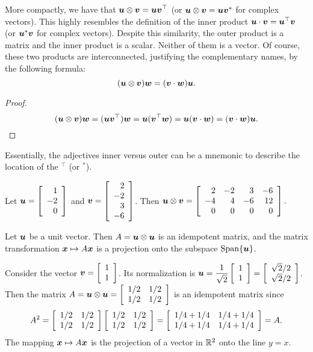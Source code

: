 More compactly, we have that $\bb u \otimes \bb v= \bb u\bb v^\top$ (or $\bb u \otimes \bb v = \bb u\bb v^*$ for complex vectors). This highly resembles the definition of the inner product  $\bb u \cdot \bb v = \bb u^\top \bb v$ (or $\bb u^*\bb v$ for complex vectors). Despite this similarity, the outer product is a matrix and the inner product is a scalar. Neither of them is a vector. Of course, these two products are interconnected, justifying the complementary names, by the following formula:
\[(\bb u\otimes \bb v)\bb w = (\bb v\cdot \bb w)\bb u.\]
\begin{proof}
\[(\bb u\otimes \bb v)\bb w = (\bb u\bb v^\top)\bb w = \bb u(\bb v^\top\bb w) = \bb u(\bb v\cdot \bb w) = (\bb v \cdot \bb w)\bb u. \qedhere\]
\end{proof}
Essentially, the adjectives inner versus outer can be a mnemonic to describe the location of the $\mbox{}^\top$ (or $\mbox{}^*$).

\begin{Exam} Let $\bb u = \vr{1 \\ -2\\ 0 }$ and $\bb v = \vr{2\\ -2\\ 3\\ -6}$. Then $\bb u \otimes \bb v = \mtx{rrrr}{2 & -2 & 3 & -6\\ -4 & 4 & -6 & 12\\ 0 & 0 & 0 &0}.$
\end{Exam}\vs

\begin{Thm} Let $\bb u$ be a unit vector. Then $A = \bb u\otimes \bb u$ is an idempotent matrix, and the matrix transformation $\bb x \mapsto A\bb x$ is a projection onto the subspace $\Span\{\bb u\}$.
\end{Thm}\vs

\begin{Exam}\label{exam:yx} Consider the vector $\bb v = \vr{1\\1}$. Its normalization is $\bb u = \dfrac{1}{\sqrt{2}}\vr{1\\1} = \vr{\sqrt{2}/2 \\ \sqrt{2}/2}$. Then the matrix $A = \bb u \otimes \bb u = \mtx{rr}{1/2 & 1/2\\ 1/2 & 1/2}$ is an idempotent matrix since
\[A^2 = \mtx{rr}{1/2 & 1/2\\ 1/2 & 1/2}\mtx{rr}{1/2 & 1/2\\ 1/2 & 1/2} =  \mtx{rr}{1/4+1/4 & 1/4+1/4\\ 1/4+1/4 & 1/4+1/4} = A.\] The mapping $\bb x \mapsto A\bb x$ is the projection of a vector in $\R^2$ onto the line $y=x$.
\end{Exam}\vs

